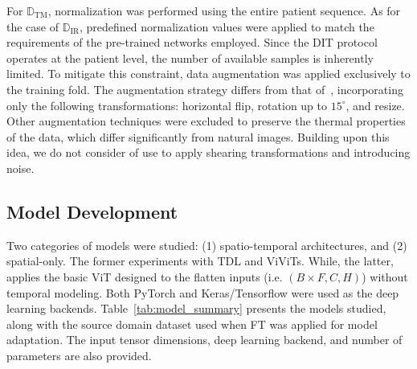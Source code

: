\documentclass[runningheads]{llncs}
\begin{document}
For $\mathbb{D}_{\mathrm{TM}}$, normalization was performed using the entire
patient sequence. As for the case of $\mathbb{D}_{\mathrm{IR}}$, predefined
normalization values were applied to match the requirements of the
pre-trained networks employed.  Since the \ac{DIT} protocol operates
at the patient level, the number of available samples is inherently
limited. To mitigate this constraint, data augmentation was applied
exclusively to the training fold. The augmentation strategy differs
from that of~\cite{DeMatheus2023}, incorporating only the following
transformations: horizontal flip, rotation up to $15^{\circ}$, and
resize. Other augmentation techniques were excluded to preserve the
thermal properties of the data, which differ significantly from
natural images. Building upon this idea, we do not consider of use to
apply shearing transformations and introducing noise. 




\subsection{Model Development}
\label{sec:model-development}

Two categories of models were studied: (1) spatio-temporal
architectures, and (2) spatial-only. The former experiments with
\ac{TDL} and \ac{ViViTs}. While, the latter, applies the basic
\ac{ViT} designed to the flatten inputs (i.e.  $(B\times F, C, H)$)
without temporal modeling. Both PyTorch and Keras/Tensorflow were used
as the deep learning backends. Table~\ref{tab:model_summary} presents
the models studied, along with the source domain dataset used when
\ac{FT} was applied for model adaptation. The input tensor dimensions,
deep learning backend, and number of parameters are also provided. 
\end{document}
